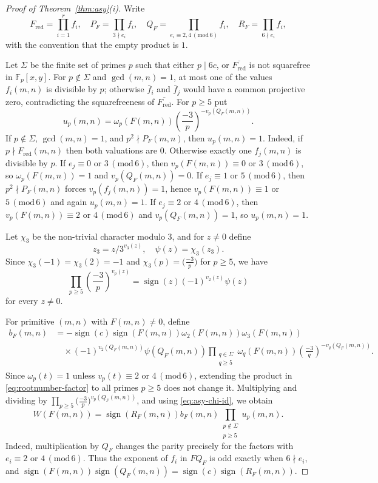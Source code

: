 \documentclass[12pt,reqno]{amsart}
\numberwithin{equation}{section}
\theoremstyle{definition}
\renewcommand{\ge}{\geqslant}
\newcommand{\FF}{\mathbb{F}}
\DeclareMathOperator{\sign}{sign}
\newcommand{\rw}{W}
\renewcommand{\pmod}[1]{\,(\mathrm{mod}\,#1)}
\begin{document}
\begin{proof}[Proof of Theorem~\ref{thm:asy}(i)]
Write
\[
F_{\mathrm{red}}=\prod_{i=1}^r f_i,\quad
P_F=\prod_{3\nmid e_i}f_i,
\quad
Q_F=\prod_{e_i\equiv2,4\pmod6}f_i,
\quad
R_F=\prod_{6\nmid e_i}f_i,
\]
with the convention that the empty product is $1$.

Let $\Sigma$ be the finite set of primes $p$ such that either $p\mid 6c$, or $\overline{F_{\mathrm{red}}}$ is not squarefree in $\FF_p[x,y]$.
For $p\notin \Sigma$ and $\gcd(m,n)=1$, at most one of the values $f_i(m,n)$ is divisible by $p$; otherwise $\bar f_i$ and $\bar f_j$ would have a common projective zero, contradicting the squarefreeness of $\overline{F_{\mathrm{red}}}$.
For $p\ge 5$ put
\[
u_p(m,n)=\omega_p(F(m,n))
\left(\frac{-3}{p}\right)^{-v_p(Q_F(m,n))}.
\]
If $p\notin \Sigma$, $\gcd(m,n)=1$, and $p^2\nmid P_F(m,n)$, then $u_p(m,n)=1$.
Indeed, if $p\nmid F_{\mathrm{red}}(m,n)$ then both valuations are $0$.
Otherwise exactly one $f_j(m,n)$ is divisible by $p$.
If $e_j\equiv0$ or $3\pmod6$, then $v_p(F(m,n))\equiv 0$ or $3 \pmod{6}$, so $\omega_p(F(m,n))=1$ and $v_p(Q_F(m,n))=0$.
If $e_j\equiv1$ or $5\pmod6$, then $p^2\nmid P_F(m,n)$ forces $v_p(f_j(m,n))=1$, hence $v_p(F(m,n))\equiv 1$ or $5 \pmod{6}$ and again $u_p(m,n)=1$.
If $e_j\equiv2$ or $4\pmod6$, then $v_p(F(m,n))\equiv 2$ or $4 \pmod{6}$ and $v_p(Q_F(m,n))=1$, so $u_p(m,n)=1$.

Let $\chi_3$ be the non-trivial character modulo $3$, and for $z\neq 0$ define
\[
z_3=z/3^{v_3(z)},
\quad
\psi(z)=\chi_3(z_3).
\]
Since $\chi_3(-1)=\chi_3(2)=-1$ and $\chi_3(p)=\bigl(\frac{-3}{p}\bigr)$ for $p\ge5$, we have
\begin{equation}\label{eq:asy-chi-id}
\prod_{p\ge 5}\left(\frac{-3}{p}\right)^{v_p(z)}
=\sign(z)(-1)^{v_2(z)}\psi(z)
\end{equation}
for every $z\neq 0$.

For primitive $(m,n)$ with $F(m,n)\neq 0$, define
\begin{align*}
b_F(m,n)
&=-\sign(c)\sign(F(m,n))\omega_2(F(m,n))\omega_3(F(m,n))\\
&\quad \times (-1)^{v_2(Q_F(m,n))}\psi(Q_F(m,n))
\prod_{\substack{q\in \Sigma\\ q\ge 5}}
\omega_q(F(m,n))
\left(\frac{-3}{q}\right)^{-v_q(Q_F(m,n))}.
\end{align*}
Since $\omega_p(t)=1$ unless $v_p(t)\equiv 2$ or $4 \pmod{6}$, extending the product in \eqref{eq:rootnumber-factor} to all primes $p\ge 5$ does not change it.
Multiplying and dividing by $\prod_{p\ge 5}\bigl(\frac{-3}{p}\bigr)^{v_p(Q_F(m,n))}$, and using \eqref{eq:asy-chi-id}, we obtain
\begin{equation}\label{eq:asy-factor-main}
\rw(F(m,n))
=\sign(R_F(m,n))b_F(m,n)
\prod_{\substack{p\notin \Sigma\\ p\ge 5}}u_p(m,n).
\end{equation}
Indeed, multiplication by $Q_F$ changes the parity precisely for the factors with $e_i\equiv2$ or $4\pmod6$.
Thus the exponent of $f_i$ in $FQ_F$ is odd exactly when $6\nmid e_i$, and $\sign(F(m,n))\sign(Q_F(m,n))=\sign(c)\sign(R_F(m,n))$.


\end{proof}
\end{document}
